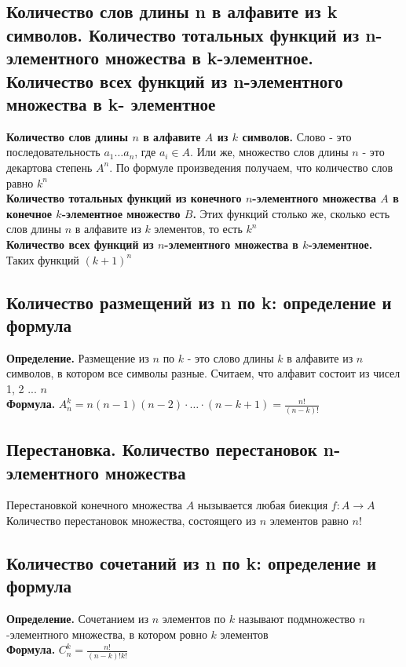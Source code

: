 \documentclass[a4paper]{article}
\begin{document}
\subsection{Количество слов длины n в алфавите из k символов. Количество тотальных функций из n-элементного множества в k-элементное. Количество всех функций из n-элементного множества в k- элементное}
\textbf{Количество слов длины $n$ в алфавите $A$ из $k$ символов.} Слово - это последовательность $a_1\ldots a_n$, где $a_i\in A.$ Или же, множество слов длины $n$ - это декартова степень $A^n.$ По формуле произведения получаем, что количество слов равно $k^n$\\[2mm]
\indent \textbf{Количество тотальных функций из конечного $n$-элементного множества $A$ в конечное $k$-элементное множество $B$.} Этих функций столько же, сколько есть слов длины $n$ в алфавите из $k$ элементов, то есть $k^n$\\[2mm]
\indent \textbf{Количество всех функций из $n$-элементного множества в $k$-элементное.} Таких функций $(k+1)^n$
\subsection{Количество размещений из n по k: определение и формула}
\textbf{Определение. }Размещение из $n$ по $k$ - это слово длины $k$ в алфавите из $n$ символов, в котором все символы разные. Считаем, что алфавит состоит из чисел 1, 2 ... $n$\\[2mm]
\textbf{Формула.} $A^k_n=n(n-1)(n-2)\cdot\ldots\cdot(n-k+1)=\frac{n!}{(n-k)!}$
\subsection{Перестановка. Количество перестановок n-элементного множества}
Перестановкой конечного множества $A$ нызывается любая биекция $f: A\rightarrow A$\\[2mm]
Количество перестановок множества, состоящего из $n$ элементов равно $n!$
\subsection{Количество сочетаний из n по k: определение и формула}
\textbf{Определение. }Сочетанием из $n$ элементов по $k$ называют подмножество $n$-элементного множества, в котором ровно $k$ элементов\\[2mm]
\textbf{Формула.} $C^k_n=\frac{n!}{(n-k)!k!}$
\end{document}
